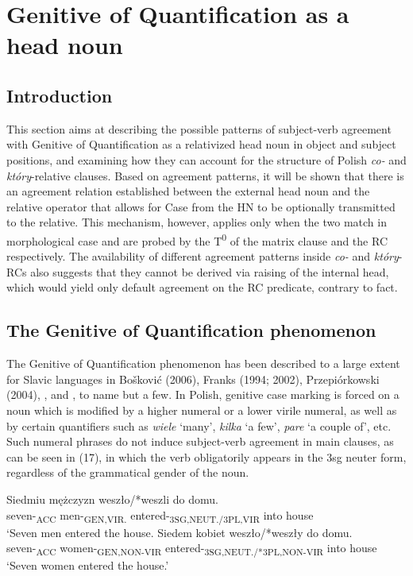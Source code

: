 \documentclass[output=paper]{langsci/langscibook}
\begin{document}
\section{Genitive of Quantification as a head noun} %

\subsection{Introduction}%

This section aims at describing the possible patterns of subject-verb agreement with Genitive of Quantification as a relativized head noun in object and subject positions, and examining how they can account for the structure of Polish \textit{co{}-} and \textit{który}{}-relative clauses. Based on agreement patterns, it will be shown that there is an agreement relation established between the external head noun and the relative operator that allows for Case from the HN to be optionally transmitted to the relative. This mechanism, however, applies only when the two match in morphological case and are probed by the T\textsuperscript{0} of the matrix clause and the RC respectively. The availability of different agreement patterns inside \textit{co{}-} and \textit{który}{}-RCs also suggests that they cannot be derived via raising of the internal head, which would yield only default agreement on the RC predicate, contrary to fact. 

\subsection{The Genitive of Quantification phenomenon}%

The Genitive of Quantification phenomenon has been described to a large extent for Slavic languages in Bošković (2006), Franks (1994; 2002), Przepiórkowski (2004), \citet{Rutkowski2002}, and \citet{Willim2003}, to name but a few. In Polish, genitive case marking is forced on a noun which is modified by a higher numeral or a lower virile numeral, as well as by certain quantifiers such as \textit{wiele} ‘many’, \textit{kilka} ‘a few’, \textit{pare} ‘a couple of’, etc. Such numeral phrases do not induce subject-verb agreement in main clauses, as can be seen in (17), in which the verb obligatorily appears in the 3sg neuter form, regardless of the grammatical gender of the noun. 

\ea%
    \label{ex:leska:17}
    \ea
    \gll Siedmiu   mężczyzn   weszło/*weszli   do   domu.\\
         seven-\textsubscript{ACC}   men-\textsubscript{GEN,VIR.}   entered-\textsubscript{3SG,NEUT./3PL,VIR} into   house\\
    \glt ‘Seven men entered the house.
    \ex
    \gll Siedem   kobiet   weszło/*weszły      do domu.\\
         seven-\textsubscript{ACC}   women-\textsubscript{GEN,NON-VIR}   entered-\textsubscript{3SG,NEUT./*3PL,NON-VIR} into house\\
    \glt ‘Seven women entered the house.’
    \z
\z
    
\end{document}
